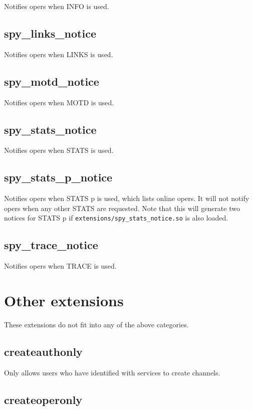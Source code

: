	Notifies opers when INFO is used.

\subsection{spy\_links\_notice}

	Notifies opers when LINKS is used.

\subsection{spy\_motd\_notice}

	Notifies opers when MOTD is used.

\subsection{spy\_stats\_notice}

	Notifies opers when STATS is used.

\subsection{spy\_stats\_p\_notice}

	Notifies opers when STATS p is used, which lists online opers.
	It will not notify opers when any other STATS are requested.
	Note that this will generate two notices for STATS p if
	\nolinkurl{extensions/spy\_stats\_notice.so} is also loaded.

\subsection{spy\_trace\_notice}

	Notifies opers when TRACE is used.


\section{Other extensions}
\label{miscextensions}

	These extensions do not fit into any of the above categories.

\subsection{createauthonly}

	Only allows users who have identified with services to create channels.

\subsection{createoperonly}


